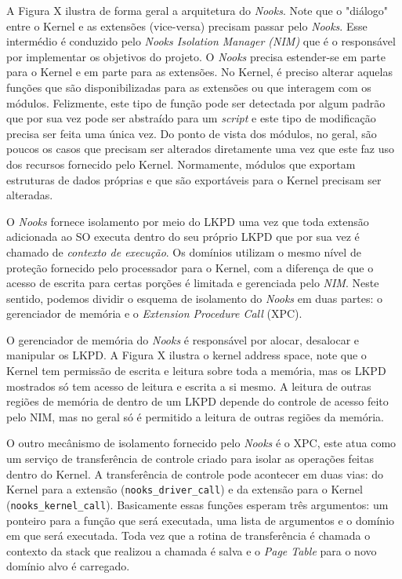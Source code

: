 
A Figura X ilustra de forma geral a arquitetura do \emph{Nooks}. Note que o
"diálogo" entre o Kernel e as extensões (vice-versa) precisam passar pelo
\emph{Nooks}. Esse intermédio é conduzido pelo \emph{Nooks Isolation Manager
(NIM)} que é o responsável por implementar os objetivos do projeto. O
\emph{Nooks} precisa estender-se em parte para o Kernel e em parte para as
extensões. No Kernel, é preciso alterar aquelas funções que são
disponibilizadas para as extensões ou que interagem com os módulos. Felizmente,
este tipo de função pode ser detectada por algum padrão que por sua vez pode
ser abstraído para um \emph{script} e este tipo de modificação precisa ser
feita uma única vez. Do ponto de vista dos módulos, no geral, são poucos os
casos que precisam ser alterados diretamente uma vez que este faz uso dos
recursos fornecido pelo Kernel. Normamente, módulos que exportam estruturas de
dados próprias e que são exportáveis para o Kernel precisam ser alteradas.

O \emph{Nooks} fornece isolamento por meio do LKPD uma vez que toda extensão
adicionada ao SO executa dentro do seu próprio LKPD que por sua vez é chamado
de \emph{contexto de execução}. Os domínios utilizam o mesmo nível de proteção
fornecido pelo processador para o Kernel, com a diferença de que o acesso de
escrita para certas porções é limitada e gerenciada pelo \emph{NIM}. Neste
sentido, podemos dividir o esquema de isolamento do \emph{Nooks} em duas partes:
o gerenciador de memória e o \emph{Extension Procedure Call} (XPC).


O gerenciador de memória do \emph{Nooks} é responsável por alocar, desalocar e
manipular os LKPD. A Figura X ilustra o kernel address space, note que o Kernel
tem permissão de escrita e leitura sobre toda a memória, mas os LKPD mostrados
só tem acesso de leitura e escrita a si mesmo. A leitura de outras regiões de
memória de dentro de um LKPD depende do controle de acesso feito pelo NIM, mas
no geral só é permitido a leitura de outras regiões da memória.

O outro mecânismo de isolamento fornecido pelo \emph{Nooks} é o XPC, este atua
como um serviço de transferência de controle criado para isolar as operações
feitas dentro do Kernel. A transferência de controle pode acontecer em duas
vias: do Kernel para a extensão (\texttt{nooks\_driver\_call}) e da extensão
para o Kernel (\texttt{nooks\_kernel\_call}). Basicamente essas funções esperam
três argumentos: um ponteiro para a função que será executada, uma lista de
argumentos e o domínio em que será executada. Toda vez que a rotina de
transferência é chamada o contexto da stack que realizou a chamada é salva e o
\emph{Page Table} para o novo domínio alvo é carregado.

